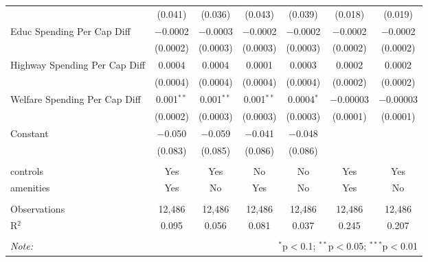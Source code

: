 \begin{table}[!htbp]
\begin{tabular}{@{\extracolsep{5pt}}lcccccc}
  & (0.041) & (0.036) & (0.043) & (0.039) & (0.018) & (0.019) \\ 
  Educ Spending Per Cap Diff & $-$0.0002 & $-$0.0003 & $-$0.0002 & $-$0.0002 & $-$0.0002 & $-$0.0002 \\ 
  & (0.0002) & (0.0003) & (0.0003) & (0.0003) & (0.0002) & (0.0002) \\ 
  Highway Spending Per Cap Diff & 0.0004 & 0.0004 & 0.0001 & 0.0003 & 0.0002 & 0.0002 \\ 
  & (0.0004) & (0.0004) & (0.0004) & (0.0004) & (0.0002) & (0.0002) \\ 
  Welfare Spending Per Cap Diff & 0.001$^{**}$ & 0.001$^{**}$ & 0.001$^{**}$ & 0.0004$^{*}$ & $-$0.00003 & $-$0.00003 \\ 
  & (0.0002) & (0.0003) & (0.0003) & (0.0003) & (0.0001) & (0.0001) \\ 
  Constant & $-$0.050 & $-$0.059 & $-$0.041 & $-$0.048 &  &  \\ 
  & (0.083) & (0.085) & (0.086) & (0.086) &  &  \\ 
 \hline \\[-1.8ex] 
controls & Yes & Yes & No & No & Yes & Yes \\ 
amenities & Yes & No & Yes & No & Yes & No \\ 
\hline \\[-1.8ex] 
Observations & 12,486 & 12,486 & 12,486 & 12,486 & 12,486 & 12,486 \\ 
R$^{2}$ & 0.095 & 0.056 & 0.081 & 0.037 & 0.245 & 0.207 \\ 
\hline 
\hline \\[-1.8ex] 
\textit{Note:}  & \multicolumn{6}{r}{$^{*}$p$<$0.1; $^{**}$p$<$0.05; $^{***}$p$<$0.01} \\ 
\end{tabular} 
\end{table} 
